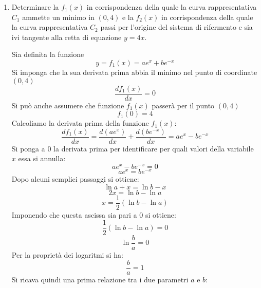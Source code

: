 \documentclass[a4paper,12pt]{article}
\begin{document}
\begin{enumerate}
\item  Determinare la $f_1(x)$  in corrispondenza della quale la curva rappresentativa $C_1$ ammette un minimo in $(0,4)$ e la $f_2(x)$ in corrispondenza della quale la curva rappresentativa $C_2$ passi per l’origine del sistema di rifermento e sia ivi tangente alla retta di equazione $y = 4x$.

Sia definita la funzione \begin{equation}y =f_1(x) = ae^x+ be^{-x}\end{equation} 
Si imponga che la sua derivata prima abbia  il minimo nel punto di coordinate $(0,4)$
\begin{equation}\label{cond1} \frac{df_1(x)}{dx}=0\end{equation} 
Si può anche assumere che funzione $f_1(x)$ passerà per il punto $(0,4)$
\begin{equation}\label{cond2}f_1(0)=4\end{equation}
Calcoliamo la derivata prima della funzione $f_1(x)$:
\begin{equation}\label{derf1} \frac{df_1(x)}{dx} = \frac{d(ae^x)}{dx} + \frac{d(be^{-x})}{dx} = ae^x-be^{-x}\end{equation} 
Si ponga a $0$ la derivata prima per identificare per quali valori della variabile $x$ essa si annulla:
\begin{equation} ae^x-be^{-x}=0\end{equation}
\begin{equation} ae^x=be^{-x}\end{equation}
Dopo alcuni semplici passaggi si ottiene:
\begin{equation}\ln{a}+x = \ln{b}-x\end{equation}
\begin{equation}2x = \ln{b}-\ln{a}\end{equation}
\begin{equation}x =\frac{1}{2}(\ln{b}-\ln{a})\end{equation}
Imponendo che questa ascissa sia pari a $0$ si ottiene:
\begin{equation}\frac{1}{2} (\ln{b}-\ln{a}) = 0\end{equation}
\begin{equation}\ln\frac{b}{a}= 0\end{equation}
Per la proprietà dei logaritmi si ha:
\begin{equation}\frac{b}{a}= 1\end{equation}
Si ricava quindi una prima relazione tra i due parametri $a$ e $b$:

\end{enumerate}
\end{document}
